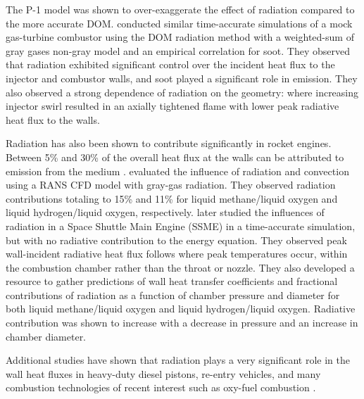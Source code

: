 The P-1 model was shown to over-exaggerate the effect of radiation compared to the more accurate DOM.
\citet{Ghose2016PredictionLevels} conducted similar time-accurate simulations of a mock gas-turbine combustor using the DOM radiation method with a weighted-sum of gray gases non-gray model and an empirical correlation for soot. They observed that radiation exhibited significant control over the incident heat flux to the injector and combustor walls, and soot played a significant role in emission. They also observed a strong dependence of radiation on the geometry: where increasing injector swirl resulted in an axially tightened flame with lower peak radiative heat flux to the walls.



Radiation has also been shown to contribute significantly in rocket engines. Between 5\% and 30\% of the overall heat flux at the walls can be attributed to emission from the medium \cite{Johnson2021AnalysisMethod,Sutton2001RocketElements,Naraghi2005ModelingEngines,Pizzarelli2021OverviewChambers}. \citet{Leccese2018ConvectiveChambers} evaluated the influence of radiation and convection using a RANS CFD model with gray-gas radiation. 
They observed radiation contributions totaling to 15\% and 11\% for liquid methane/liquid oxygen and liquid hydrogen/liquid oxygen, respectively.
\citet{Leccese2019NumericalChambers} later studied the influences of radiation in a Space Shuttle Main Engine (SSME) in a time-accurate simulation, but with no radiative contribution to the energy equation.
They observed peak wall-incident radiative heat flux follows where peak temperatures occur, within the combustion chamber rather than the throat or nozzle. They also developed a resource to gather predictions of wall heat transfer coefficients and fractional contributions of radiation as a function of chamber pressure and diameter for both liquid methane/liquid oxygen and liquid hydrogen/liquid oxygen.
Radiative contribution was shown to increase with a decrease in pressure and an increase in chamber diameter.

Additional studies have shown that radiation plays a very significant role in the wall heat fluxes in heavy-duty diesel pistons, re-entry vehicles, and many combustion technologies of recent interest such as oxy-fuel combustion \cite{Modest2016RadiativeSystems,Viskanta1987RadiationSystems}.



